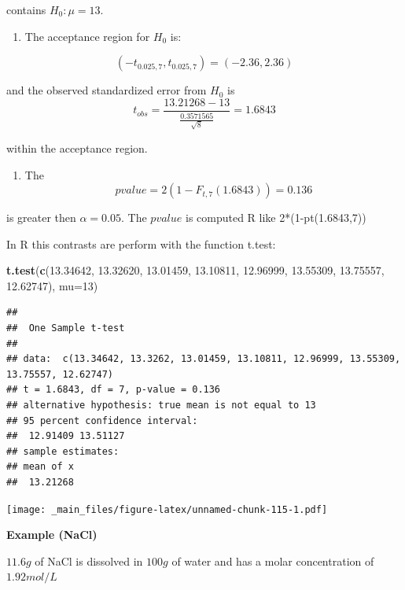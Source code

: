 \documentclass[
]{book}
\newenvironment{Shaded}{\begin{snugshade}}{\end{snugshade}}
\newcommand{\AttributeTok}[1]{\textcolor[rgb]{0.13,0.29,0.53}{#1}}
\newcommand{\DecValTok}[1]{\textcolor[rgb]{0.00,0.00,0.81}{#1}}
\newcommand{\FloatTok}[1]{\textcolor[rgb]{0.00,0.00,0.81}{#1}}
\newcommand{\FunctionTok}[1]{\textcolor[rgb]{0.13,0.29,0.53}{\textbf{#1}}}
\newcommand{\NormalTok}[1]{#1}
\providecommand{\tightlist}{%
  \setlength{\itemsep}{0pt}\setlength{\parskip}{0pt}}
\begin{document}
contains \(H_0:\mu=13\).

\begin{enumerate}
\def\labelenumi{\arabic{enumi}.}
\setcounter{enumi}{1}
\tightlist
\item
  The acceptance region for \(H_0\) is:
\end{enumerate}

\[(-t_{0.025,7}, t_{0.025,7})=( -2.36,  2.36)\]

and the observed standardized error from \(H_0\) is
\[t_{obs} =  \frac{13.21268-13}{\frac{0.3571565}{\sqrt{8}}}=1.6843\]

within the acceptance region.

\begin{enumerate}
\def\labelenumi{\arabic{enumi}.}
\setcounter{enumi}{2}
\tightlist
\item
  The \[pvalue=2(1-F_{t,7}(1.6843))=0.136\]
\end{enumerate}

is greater then \(\alpha=0.05\). The \(pvalue\) is computed R like 2*(1-pt(1.6843,7))

In R this contrasts are perform with the function t.test:

\begin{Shaded}
\begin{Highlighting}[]
\FunctionTok{t.test}\NormalTok{(}\FunctionTok{c}\NormalTok{(}\FloatTok{13.34642}\NormalTok{, }\FloatTok{13.32620}\NormalTok{, }\FloatTok{13.01459}\NormalTok{, }\FloatTok{13.10811}\NormalTok{,}
         \FloatTok{12.96999}\NormalTok{, }\FloatTok{13.55309}\NormalTok{, }\FloatTok{13.75557}\NormalTok{, }\FloatTok{12.62747}\NormalTok{), }
       \AttributeTok{mu=}\DecValTok{13}\NormalTok{)}
\end{Highlighting}
\end{Shaded}

\begin{verbatim}
## 
##  One Sample t-test
## 
## data:  c(13.34642, 13.3262, 13.01459, 13.10811, 12.96999, 13.55309, 13.75557, 12.62747)
## t = 1.6843, df = 7, p-value = 0.136
## alternative hypothesis: true mean is not equal to 13
## 95 percent confidence interval:
##  12.91409 13.51127
## sample estimates:
## mean of x 
##  13.21268
\end{verbatim}

\texttt{[image: \_main\_files/figure-latex/unnamed-chunk-115-1.pdf]}

\textbf{Example (NaCl)}

\(11.6g\) of NaCl is dissolved in \(100 g\) of water and has a molar concentration of \(1.92 mol/L\)
\end{document}
